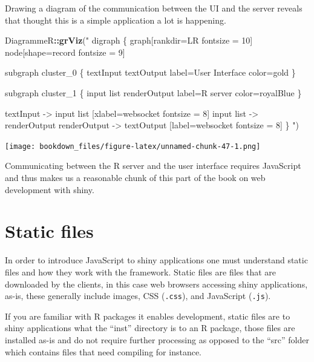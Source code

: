 \documentclass[
]{krantz}
\makeatletter
\newenvironment{Shaded}{\begin{snugshade}}{\end{snugshade}}
\newcommand{\KeywordTok}[1]{\textcolor[rgb]{0.27,0.27,0.27}{\textbf{#1}}}
\newcommand{\NormalTok}[1]{#1}
\newcommand{\OperatorTok}[1]{\textcolor[rgb]{0.43,0.43,0.43}{\textbf{#1}}}
\newcommand{\StringTok}[1]{\textcolor[rgb]{0.5,0.5,0.5}{#1}}
\newenvironment{kframe}{%
\medskip{}
\setlength{\fboxsep}{.8em}
 \def\at@end@of@kframe{}%
 \ifinner\ifhmode%
  \def\at@end@of@kframe{\end{minipage}}%
  \begin{minipage}{\columnwidth}%
 \fi\fi%
 \def\FrameCommand##1{\hskip\@totalleftmargin \hskip-\fboxsep
 \colorbox{shadecolor}{##1}\hskip-\fboxsep
     \hskip-\linewidth \hskip-\@totalleftmargin \hskip\columnwidth}%
 \MakeFramed {\advance\hsize-\width
   \@totalleftmargin\z@ \linewidth\hsize
   \@setminipage}}%
 {\par\unskip\endMakeFramed%
 \at@end@of@kframe}
\renewenvironment{Shaded}{\begin{kframe}}{\end{kframe}}
\makeatother
\begin{document}
Drawing a diagram of the communication between the UI and the server reveals that thought this is a simple application a lot is happening.

\begin{Shaded}
\begin{Highlighting}[]
\NormalTok{DiagrammeR}\OperatorTok{::}\KeywordTok{grViz}\NormalTok{(}\StringTok{"}
\StringTok{digraph \{}
\StringTok{  graph[rankdir=LR fontsize = 10]}
\StringTok{  node[shape=record fontsize = 9]}

\StringTok{  subgraph cluster\_0 \{}
\StringTok{    textInput}
\StringTok{    textOutput}
\StringTok{    label=\textquotesingle{}User Interface\textquotesingle{}}
\StringTok{    color=gold}
\StringTok{  \}}

\StringTok{  subgraph cluster\_1 \{}
\StringTok{    \textquotesingle{}input list\textquotesingle{}}
\StringTok{    renderOutput}
\StringTok{    label=\textquotesingle{}R server\textquotesingle{}}
\StringTok{    color=royalBlue}
\StringTok{  \}}

\StringTok{  textInput {-}> \textquotesingle{}input list\textquotesingle{} [xlabel=websocket fontsize = 8]}
\StringTok{  \textquotesingle{}input list\textquotesingle{} {-}> renderOutput}
\StringTok{  renderOutput {-}> textOutput [label=websocket fontsize = 8]}
\StringTok{\}}
\StringTok{"}\NormalTok{)}
\end{Highlighting}
\end{Shaded}

\texttt{[image: bookdown\_files/figure-latex/unnamed-chunk-47-1.png]}

Communicating between the R server and the user interface requires JavaScript and thus makes us a reasonable chunk of this part of the book on web development with shiny.

\hypertarget{static-files}{%
\section{Static files}\label{static-files}}

In order to introduce JavaScript to shiny applications one must understand static files and how they work with the framework. Static files are files that are downloaded by the clients, in this case web browsers accessing shiny applications, as-is, these generally include images, CSS (\texttt{.css}), and JavaScript (\texttt{.js}).

If you are familiar with R packages it enables development, static files are to shiny applications what the ``inst'' directory is to an R package, those files are installed as-is and do not require further processing as opposed to the ``src'' folder which contains files that need compiling for instance.
\end{document}
